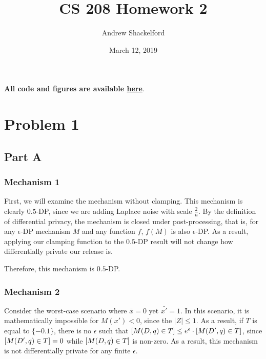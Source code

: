 \documentclass[12pt]{article}
\title{CS 208 Homework 2}
\author{Andrew Shackelford}
\date{March 12, 2019}
\let\Pr\relax
\DeclareMathOperator*{\Pr}{\mathbb{P}}
\begin{document}
\maketitle

\textbf{All code and figures are available \href{https://github.com/andrew-shackelford/cs208/tree/master/2}{here}}.

{
  \hypersetup{linkcolor=black, hidelinks}
  \tableofcontents
}

\newpage

\section{Problem 1}

\subsection{Part A}

\subsubsection*{Mechanism 1}

\noindent

First, we will examine the mechanism without clamping. This mechanism is clearly $0.5$-DP, since we are adding Laplace noise with scale $\frac{2}{n}$. By the definition of differential privacy, the mechanism is closed under post-processing, that is, for any $\epsilon$-DP mechanism $M$ and any function $f$, $f(M)$ is also $\epsilon$-DP. As a result, applying our clamping function to the $0.5$-DP result will not change how differentially private our release is.

\bigskip

Therefore, this mechanism is $0.5$-DP.

\subsubsection*{Mechanism 2}

Consider the worst-case scenario where $\bar{x} = 0$ yet $\bar{x'} = 1$. In this scenario, it is mathematically impossible for $M(x') < 0$, since the $|Z| \leq 1$. As a result, if $T$ is equal to $\{-0.1\}$, there is no $\epsilon$ such that $\Pr[M(D, q) \in T] \leq e^\epsilon \cdot \Pr[M(D', q) \in T]$, since $\Pr[M(D', q) \in T] = 0$ while $\Pr[M(D, q) \in T]$ is non-zero. As a result, this mechanism is not differentially private for any finite $\epsilon$.
\end{document}
